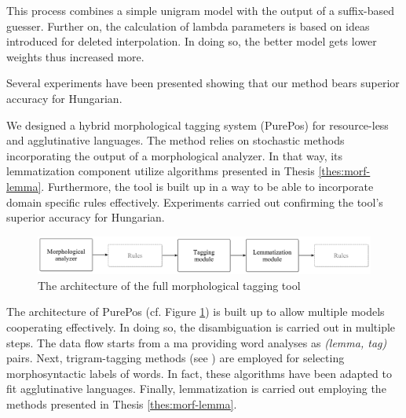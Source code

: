 This process combines a simple unigram model with the output of a suffix-based guesser. 
Further on, the calculation of lambda parameters is based on ideas introduced for deleted interpolation.
In doing so, the better model gets lower weights thus increased more.

Several experiments have been presented showing that our method bears superior accuracy for Hungarian. 

\thesisline%


\begin{core}
\begin{thesis}\label{thes:morf-tagging}
We designed a hybrid morphological tagging system (PurePos) for resource-less and agglutinative languages.
The method relies on stochastic methods incorporating the output of a morphological analyzer.
In that way, its lemmatization component utilize algorithms presented in Thesis \ref{thes:morf-lemma}.
Furthermore, the tool is built up in a way to be able to incorporate domain specific rules effectively.
Experiments carried out confirming the tool's superior accuracy for Hungarian.
\end{thesis}

\begin{pub}
\cite{Orosz2011,Orosz2012,Orosz2012a,Orosz2013a}
\end{pub}
\end{core}

\begin{figure}[ht] 
  \centering
  \includegraphics[width=1\textwidth]{MorphTagging/architecture.png} 
  \caption{The architecture of the full morphological tagging tool}
  \label{fig:purepos-arch_en}
\end{figure}

The architecture of PurePos (cf. Figure \ref{fig:purepos-arch_en}) is built up to allow multiple models cooperating effectively. 
In doing so, the disambiguation is carried out in multiple steps.
The data flow starts from a \acrshort{ma} providing word analyses as \emph{(lemma, tag)} pairs. 
Next, trigram-tagging methods (see \cite{Brants2000,Halacsy2007}) are employed for selecting morphosyntactic labels of words. 
In fact, these algorithms have been adapted to fit agglutinative languages.
Finally, lemmatization is carried out employing the methods presented in Thesis \ref{thes:morf-lemma}. 

